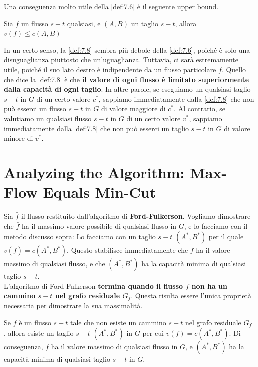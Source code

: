 Una conseguenza molto utile della \ref{def:7.6} è il seguente upper bound.

\begin{myblockquote}
  \begin{minipage}{\textwidth}
    \begin{definition}\label{def:7.8}
      Sia $f$ un flusso $s-t$ qualsiasi, e $(A, B)$ un taglio $s-t$, allora
      $
        v(f) \le c(A, B)
      $
    \end{definition}
  \end{minipage}
\end{myblockquote}

In un certo senso, la \ref{def:7.8} sembra più debole della \ref{def:7.6},
poiché è solo una disuguaglianza piuttosto che un'uguaglianza. Tuttavia, ci sarà
estremamente utile, poiché il suo lato destro è indipendente da un flusso
particolare $f$. Quello che dice la \ref{def:7.8} è che \textbf{il valore di
  ogni flusso è limitato superiormente dalla capacità di ogni taglio}. In altre
parole, se eseguiamo un qualsiasi taglio $s-t$ in $G$ di un certo valore
$c^{*}$, sappiamo immediatamente dalla \ref{def:7.8} che non può esserci un
flusso $s-t$ in $G$ di valore maggiore di $c^{*}$. Al contrario, se valutiamo un
qualsiasi flusso $s-t$ in $G$ di un certo valore $v^{*}$, sappiamo
immediatamente dalla \ref{def:7.8} che non può esserci un taglio $s-t$ in $G$ di valore
minore di $v^{*}$.

\section{Analyzing the Algorithm: Max-Flow Equals Min-Cut}

Sia $\bar{f}$ il flusso restituito dall'algoritmo di
\textbf{Ford-Fulkerson}. Vogliamo dimostrare che $\bar{f}$ ha il
massimo valore possibile di qualsiasi flusso in $G$, e lo facciamo con
il metodo discusso sopra: Lo facciamo con un taglio $s-t$
$(A^{*} , B^{*})$ per il quale $v(\bar{f}) = c(A^{*} , B^{*})$. Questo
stabilisce immediatamente che $\bar{f}$ ha il valore massimo di
qualsiasi flusso, e che $(A^{*} , B^{*})$ ha la capacità minima di
qualsiasi taglio $s-t$.\\

L'algoritmo di Ford-Fulkerson \textbf{termina quando il flusso $f$ non
  ha un cammino $s-t$ nel grafo residuale $G_f$}. Questa risulta
essere l'unica proprietà necessaria per dimostrare la sua massimalità.

\begin{myblockquote}
  \begin{minipage}{\textwidth}
    \begin{definition}\label{def:7.9}
      Se $f$ è un flusso $s-t$ tale che non esiste un cammino $s-t$ nel
      grafo residuale $G_f$ , allora esiste un taglio $s-t$
      $(A^{*} , B^{*})$ in $G$ per cui $v(f) = c(A^{*} , B^{*})$. Di
      conseguenza, $f$ ha il valore massimo di qualsiasi flusso in $G$, e
      $(A^{*} , B^{*})$ ha la capacità minima di qualsiasi taglio $s-t$ in
      $G$.
    \end{definition}
  \end{minipage}
\end{myblockquote}


